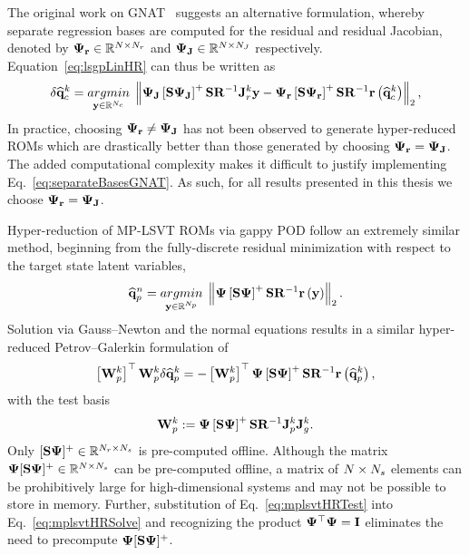%
The original work on GNAT~\cite{Carlberg2013} suggests an alternative formulation, whereby separate regression bases are computed for the residual and residual Jacobian, denoted by $\deimBasisRes \inRTwo{\numDOF}{\numResModes}$ and $\deimBasisJacob \inRTwo{\numDOF}{\numJacobModes}$ respectively. Equation~\ref{eq:lsgpLinHR} can thus be written as
%
\begin{equation}\label{eq:separateBasesGNAT}
    \delta \consVecCoef^{\newtonIdx} = \argmin{\dummyVec \inROne{\numConsModes}} \left\Vert \deimBasisJacob \left[ \sampMat \deimBasisJacob \right]^{+} \sampMat \resScaleInv \jacobRes^{\newtonIdx} \dummyVec - \deimBasisRes \left[ \sampMat \deimBasisRes \right]^{+} \sampMat \resScaleInv \resFunc{\consVecCoef^{\newtonIdx}} \right\Vert_2,
\end{equation}
%
In practice, choosing $\deimBasisRes \neq \deimBasisJacob$ has not been observed to generate hyper-reduced ROMs which are drastically better than those generated by choosing $\deimBasisRes = \deimBasisJacob$. The added computational complexity makes it difficult to justify implementing Eq.~\ref{eq:separateBasesGNAT}. As such, for all results presented in this thesis we choose $\deimBasisRes = \deimBasisJacob$.

Hyper-reduction of MP-LSVT ROMs via gappy POD follow an extremely similar method, beginning from the fully-discrete residual minimization with respect to the target state latent variables,
%
\begin{equation}
    \primVecCoef^{\timeIdx} = \argmin{\dummyVec \inROne{\numPrimModes}} \left\Vert \deimBasis \left[ \sampMat \deimBasis \right]^{+} \sampMat \resScaleInv \resFunc{\dummyVec} \right\Vert_2.
\end{equation}
%
Solution via Gauss--Newton and the normal equations results in a similar hyper-reduced Petrov--Galerkin formulation of
%
\begin{equation}\label{eq:mplsvtHRSolve}
    \left[ \testBasisPrim^\newtonIdx \right]^\top \testBasisPrim^\newtonIdx \delta \primVecCoef^{\newtonIdx} = -\left[\testBasisPrim^\newtonIdx \right]^\top \deimBasis \left[ \sampMat \deimBasis \right]^{+} \sampMat \resScaleInv \resFunc{\primVecCoef^{\newtonIdx}},
\end{equation}
%
with the test basis
%
\begin{equation}\label{eq:mplsvtHRTest}
    \testBasisPrim^\newtonIdx \defEq \deimBasis \left[ \sampMat \deimBasis \right]^{+} \sampMat \resScaleInv \jacobPrim^{\newtonIdx} \jacobDecode^{\newtonIdx}.
\end{equation}
%
Only $[ \sampMat \deimBasis ]^{+} \inRTwo{\numResModes}{\numSamps}$ is pre-computed offline. Although the matrix $\deimBasis [ \sampMat \deimBasis ]^{+} \inRTwo{\numDOF}{\numSamps}$ can be pre-computed offline, a matrix of $N \times N_s$ elements can be prohibitively large for high-dimensional systems and may not be possible to store in memory. Further, substitution of Eq.~\ref{eq:mplsvtHRTest} into Eq.~\ref{eq:mplsvtHRSolve} and recognizing the product $\deimBasis^\top \deimBasis = \identMat$ eliminates the need to precompute $\deimBasis [ \sampMat \deimBasis ]^{+}$.

